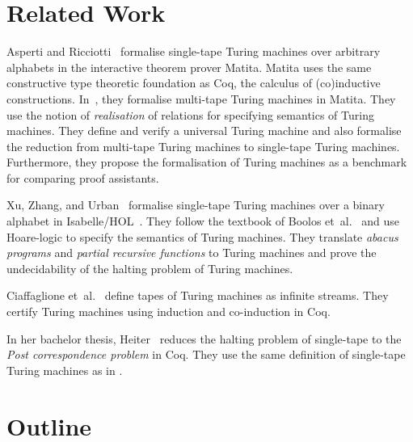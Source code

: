 \section{Related Work}
\label{sec:relatedwork}

Asperti and Ricciotti~\cite{asperti2012} formalise single-tape Turing machines over arbitrary alphabets in the interactive theorem prover Matita.
Matita uses the same constructive type theoretic foundation as Coq, the calculus of (co)inductive constructions.  In~\cite{asperti2015}, they
formalise multi-tape Turing machines in Matita.  They use the notion of \textit{realisation} of relations for specifying semantics of Turing machines.
They define and verify a universal Turing machine and also formalise the reduction from multi-tape Turing machines to single-tape Turing machines.
Furthermore, they propose the formalisation of Turing machines as a benchmark for comparing proof assistants.

Xu, Zhang, and Urban~\cite{Xu:2013:MTM:2529315.2529331} formalise single-tape Turing machines over a binary alphabet in
Isabelle/HOL~\cite{nipkow2002isabelle}.  They follow the textbook of Boolos et~al.~\cite{boolos2007computability} and use Hoare-logic to specify the
semantics of Turing machines.  They translate \textit{abacus programs} and \textit{partial recursive functions} to Turing machines and prove the
undecidability of the halting problem of Turing machines.

Ciaffaglione et~al.~\cite{Ciaffaglione:2016:TTC:2956213.2956306} define tapes of Turing machines as infinite streams.  They certify Turing machines
using induction and co-induction in Coq.

In her bachelor thesis, Heiter~\cite{Heiter} reduces the halting problem of single-tape to the \textit{Post correspondence problem} in Coq.  They use
the same definition of single-tape Turing machines as in \cite{asperti2012}.



\section{Outline}
\label{sec:outline}

